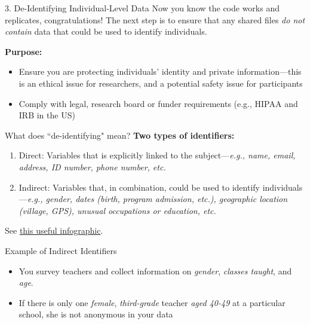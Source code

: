 \documentclass[12pt, compress]{beamer} %
\let\noteitem\item %
\renewcommand{\item}{ 
	\noteitem\vspace{\fill}
	}
\begin{document}
	\begin{frame}{3. De-Identifying Individual-Level Data}
		Now you know the code works and replicates, congratulations! The next step is to ensure that any shared files \textit{do not contain} data that could be used to identify individuals. 
		
		\bigskip
		
		\textbf{Purpose:} 
		\begin{itemize}
			\item Ensure you are \textcolor{burntorange}{protecting individuals' identity and private information}---this is an ethical issue for researchers, and a potential safety issue for participants
			\item Comply with legal, research board or funder requirements (e.g., HIPAA and IRB in the US) 
		\end{itemize}
		
	\end{frame}

	\begin{frame}{What does ``de-identifying" mean?}
		\textbf{Two types of identifiers:}
		
		\begin{enumerate}
			\item \textcolor{burntorange}{Direct:} Variables that is explicitly linked to the subject---\textit{e.g., name, email, address, ID number, phone number, etc.}
			\item \textcolor{burntorange}{Indirect:} Variables that, in combination, could be used to identify individuals---\textit{e.g., gender, dates (birth, program admission, etc.), geographic location (village, GPS), unusual occupations or education, etc.}
		\end{enumerate}
		
		\bigskip
		
		See \href{https://fpf.org/wp-content/uploads/2016/04/FPF_Visual-Guide-to-Practical-Data-DeID.pdf}{this useful infographic}.
	\end{frame}

	\begin{frame}{Example of Indirect Identifiers}	
		\begin{itemize}
			\item You survey teachers and collect information on \textit{gender}, \textit{classes taught}, and \textit{age}.
			\item If there is only one \textit{female}, \textit{third-grade} teacher \textit{aged 40-49} at a particular school, she is not anonymous in your data
		\end{itemize}
	\end{frame}		
\end{document}

